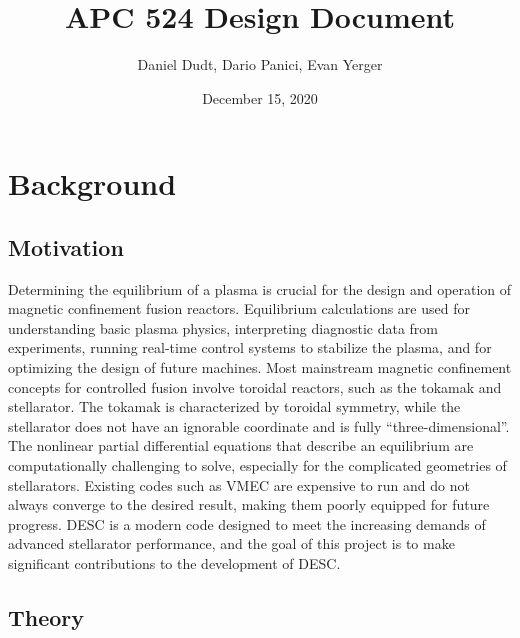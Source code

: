 \documentclass{article}
\title{APC 524 Design Document}
\author{Daniel Dudt, Dario Panici, Evan Yerger}
\date{December 15, 2020}
\begin{document}
\maketitle

\section{Background}

\subsection{Motivation}

Determining the equilibrium of a plasma is crucial for the design and operation of magnetic confinement fusion reactors.
Equilibrium calculations are used for understanding basic plasma physics, interpreting diagnostic data from experiments, running real-time control systems to stabilize the plasma, and for optimizing the design of future machines.
Most mainstream magnetic confinement concepts for controlled fusion involve toroidal reactors, such as the tokamak and stellarator.
The tokamak is characterized by toroidal symmetry, while the stellarator does not have an ignorable coordinate and is fully ``three-dimensional''.
The nonlinear partial differential equations that describe an equilibrium are computationally challenging to solve, especially for the complicated geometries of stellarators.
Existing codes such as VMEC \cite{Hirshman1983} are expensive to run and do not always converge to the desired result, making them poorly equipped for future progress.
DESC \cite{Dudt2020} is a modern code designed to meet the increasing demands of advanced stellarator performance, and the goal of this project is to make significant contributions to the development of DESC.

\subsection{Theory}
\end{document}
